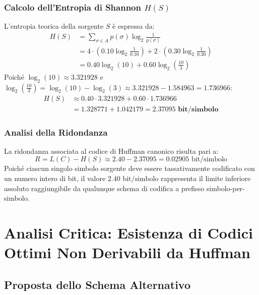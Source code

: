 \subsubsection*{Calcolo dell'Entropia di Shannon $H(S)$}
L'entropia teorica della sorgente $S$ \`e espressa da:
\begin{align}
  H(S) &= \sum_{\sigma \in A} p(\sigma) \log_2 \frac{1}{p(\sigma)} \nonumber \\
       &= 4 \cdot \left(0.10 \log_2 \frac{1}{0.10}\right) + 2 \cdot \left(0.30 \log_2 \frac{1}{0.30}\right) \nonumber \\
       &= 0.40 \log_2(10) + 0.60 \log_2\left(\frac{10}{3}\right)
\end{align}
Poich\'e $\log_2(10) \approx 3.321928$ e $\log_2\left(\frac{10}{3}\right) = \log_2(10) - \log_2(3) \approx 3.321928 - 1.584963 = 1.736966$:
\begin{align}
  H(S) &\approx 0.40 \cdot 3.321928 + 0.60 \cdot 1.736966 \nonumber \\
       &= 1.328771 + 1.042179 = \mathbf{2.37095 \text{ bit/simbolo}}
\end{align}

\subsubsection*{Analisi della Ridondanza}
La ridondanza associata al codice di Huffman canonico risulta pari a:
\begin{equation}
  R = L(C) - H(S) \approx 2.40 - 2.37095 = 0.02905 \text{ bit/simbolo}
\end{equation}
Poich\'e ciascun singolo simbolo sorgente deve essere tassativamente codificato con un numero intero di bit, il valore $2.40\text{ bit/simbolo}$ rappresenta il limite inferiore assoluto raggiungibile da qualunque schema di codifica a prefisso simbolo-per-simbolo.

\FloatBarrier
\section[Codici Ottimi Non Derivabili da Huffman]{Analisi Critica: Esistenza di Codici Ottimi Non Derivabili da Huffman}
\label{sec:codici-ottimi-non-huffman}

\subsection{Proposta dello Schema Alternativo}
\label{subsec:proposta-schema-alternativo}

